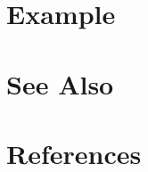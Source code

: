 \section{Example} %
\label{sec:rbaIR2ThirdOctBands_example}



\section{See Also} %
\label{sec:rbaIR2ThirdOctBands_see_also}



\section{References} %
\label{sec:rbaIR2ThirdOctBands_references}



